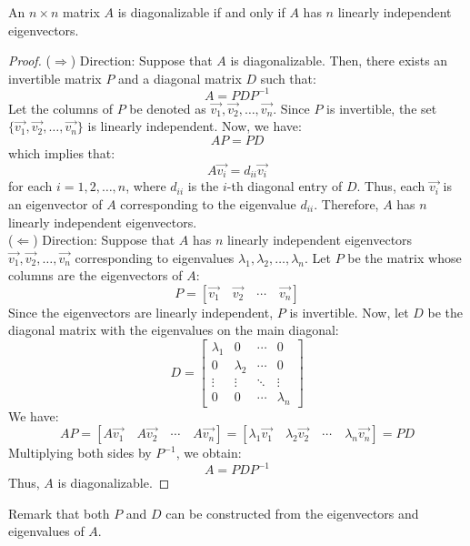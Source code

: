 \begin{theorem}
    An $n \times n$ matrix $A$ is diagonalizable if and only if $A$ has $n$ linearly independent eigenvectors.
\end{theorem}
\begin{proof}
    ($\Rightarrow$) Direction: Suppose that $A$ is diagonalizable. Then, there exists an invertible matrix $P$ and a diagonal matrix $D$ such that:
    \[A = P D P^{-1}\]
    Let the columns of $P$ be denoted as $\vec{v_1}, \vec{v_2}, \ldots, \vec{v_n}$. Since $P$ is invertible, the set $\{\vec{v_1}, \vec{v_2}, \ldots, \vec{v_n}\}$ is linearly independent. Now, we have:
    \[A P = P D\]
    which implies that:
    \[A \vec{v_i} = d_{ii} \vec{v_i}\]
    for each $i = 1, 2, \ldots, n$, where $d_{ii}$ is the $i$-th diagonal entry of $D$. Thus, each $\vec{v_i}$ is an eigenvector of $A$ corresponding to the eigenvalue $d_{ii}$. Therefore, $A$ has $n$ linearly independent eigenvectors. \\
    ($\Leftarrow$) Direction: Suppose that $A$ has $n$ linearly independent eigenvectors $\vec{v_1}, \vec{v_2}, \ldots, \vec{v_n}$ corresponding to eigenvalues $\lambda_1, \lambda_2, \ldots, \lambda_n$. Let $P$ be the matrix whose columns are the eigenvectors of $A$:
    \[P = [\vec{v_1} \quad \vec{v_2} \quad \cdots \quad \vec{v_n}]\]
    Since the eigenvectors are linearly independent, $P$ is invertible. Now, let $D$ be the diagonal matrix with the eigenvalues on the main diagonal:
    \[D = \begin{bmatrix}
        \lambda_1 & 0 & \cdots & 0 \\
        0 & \lambda_2 & \cdots & 0 \\
        \vdots & \vdots & \ddots & \vdots \\
        0 & 0 & \cdots & \lambda_n
    \end{bmatrix}\]
    We have:
    \[A P = [A \vec{v_1} \quad A \vec{v_2} \quad \cdots \quad A \vec{v_n}] = [\lambda_1 \vec{v_1} \quad \lambda_2 \vec{v_2} \quad \cdots \quad \lambda_n \vec{v_n}] = P D\]
    Multiplying both sides by $P^{-1}$, we obtain:
    \[A = P D P^{-1}\]
    Thus, $A$ is diagonalizable.
\end{proof}
Remark that both $P$ and $D$ can be constructed from the eigenvectors and eigenvalues of $A$.



